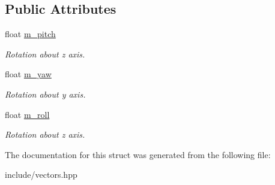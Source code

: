 \subsection*{Public Attributes}
\begin{DoxyCompactItemize}
\item 
\hypertarget{structang3_a9bbb7264d8a49210d8609710e2b4c6fe}{float \hyperlink{structang3_a9bbb7264d8a49210d8609710e2b4c6fe}{m\-\_\-pitch}}\label{structang3_a9bbb7264d8a49210d8609710e2b4c6fe}

\begin{DoxyCompactList}\small\item\em Rotation about z axis. \end{DoxyCompactList}\item 
\hypertarget{structang3_a0cfea544ea5926f87b364a7be63a87aa}{float \hyperlink{structang3_a0cfea544ea5926f87b364a7be63a87aa}{m\-\_\-yaw}}\label{structang3_a0cfea544ea5926f87b364a7be63a87aa}

\begin{DoxyCompactList}\small\item\em Rotation about y axis. \end{DoxyCompactList}\item 
\hypertarget{structang3_a04f35646812c3638ffa6b7c9c7aa371d}{float \hyperlink{structang3_a04f35646812c3638ffa6b7c9c7aa371d}{m\-\_\-roll}}\label{structang3_a04f35646812c3638ffa6b7c9c7aa371d}

\begin{DoxyCompactList}\small\item\em Rotation about z axis. \end{DoxyCompactList}\end{DoxyCompactItemize}


The documentation for this struct was generated from the following file\-:\begin{DoxyCompactItemize}
\item 
include/vectors.\-hpp\end{DoxyCompactItemize}

